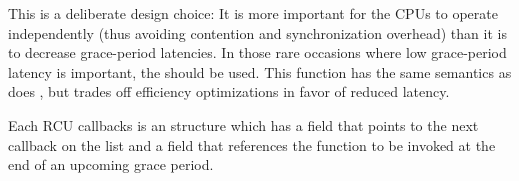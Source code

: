 %
This is a deliberate design choice: It is more important for the CPUs
to operate independently (thus avoiding contention and synchronization
overhead) than it is to decrease grace-period latencies.
In those rare occasions where low grace-period latency is important,
the  should be used.
This function has the same semantics as does ,
but trades off efficiency optimizations in favor of reduced latency.

Each RCU callbacks is an  structure which has a
 field that points to the next callback on the list and
a  field that references the function to be invoked at the
end of an upcoming grace period.


